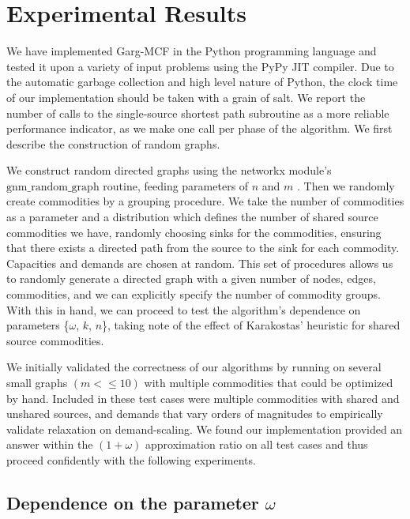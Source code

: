 \section{Experimental Results}

We have implemented Garg-MCF in the Python programming language and tested it
upon a variety of input problems using the PyPy JIT compiler. Due to the
automatic garbage collection and high level nature of Python, the clock time of
our implementation should be taken with a grain of salt. We report the number
of calls to the single-source shortest path subroutine as a more reliable
performance indicator, as we make one call per phase of the algorithm. We first
describe the construction of random graphs.

We construct random directed graphs using the networkx module's
$\mathrm{gnm\_random\_graph}$ routine, feeding parameters of $n$ and $m$
\cite{networkx}. Then we randomly create commodities by a grouping procedure.
We take the number of commodities as a parameter and a distribution which
defines the number of shared source commodities we have, randomly choosing
sinks for the commodities, ensuring that there exists a directed path from the
source to the sink for each commodity. Capacities and demands are chosen at
random. This set of procedures allows us to randomly generate a directed graph
with a given number of nodes, edges, commodities, and we can explicitly specify
the number of commodity groups. With this in hand, we can proceed to test the
algorithm's dependence on parameters \{$\omega$, $k$, $n$\}, taking note of the
effect of Karakostas' heuristic for shared source commodities.

We initially validated the correctness of our algorithms by running on several
small graphs $(m<\leq 10)$ with multiple commodities that could be optimized by
hand. Included in these test cases were multiple commodities with shared and
unshared sources, and demands that vary orders of magnitudes to empirically
validate relaxation on demand-scaling. We found our implementation provided an
answer within the $(1+\omega)$ approximation ratio on all test cases and thus
proceed confidently with the following experiments.

\subsection{Dependence on the parameter $\omega$}

